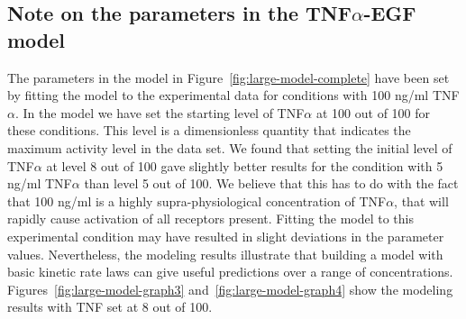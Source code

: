 \documentclass{bmcart}
\begin{document}
\subsection{Note on the parameters in the TNF$\alpha$-EGF model}\label{suppl:parameters-tnf-egf}
The parameters in the model in Figure~\ref{fig:large-model-complete}
have been set by fitting the model to the experimental data for conditions with 100 ng/ml TNF$\alpha$.
In the model we have set the starting level of TNF$\alpha$ at 100 out of 100 for these conditions.
This level is a dimensionless quantity that indicates the maximum activity level in the data set.
We found that setting the initial level of TNF$\alpha$ at level 8 out of 100 gave slightly better results for the
condition with 5 ng/ml TNF$\alpha$ than level 5 out of 100. We believe that this has to do with the fact that
100 ng/ml is a highly supra-physiological concentration of TNF$\alpha$, that will rapidly cause activation of all
receptors present. Fitting the model to this experimental condition may have resulted in slight deviations
in the parameter values. Nevertheless, the modeling results illustrate that building a model with basic
kinetic rate laws can give useful predictions over a range of concentrations. Figures~\ref{fig:large-model-graph3} and~\ref{fig:large-model-graph4}
show the modeling results with TNF set at 8 out of 100.
\end{document}
